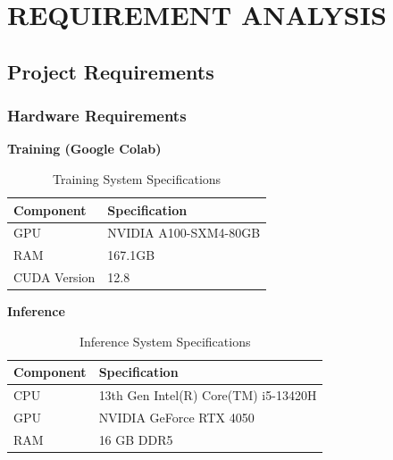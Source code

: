 \newpage
\section{\MakeUppercase{Requirement Analysis}}

\subsection{Project Requirements}

\subsubsection{Hardware Requirements}

\textbf{Training (Google Colab)}\\
\begin{table}[H]
\caption{Training System Specifications}
\label{tab:training-system-specifications}
\centering
\begin{tabular}{|l|l|}
\hline
\textbf{Component} & \textbf{Specification} \\ \hline
GPU & NVIDIA A100-SXM4-80GB \\
RAM & 167.1GB \\
CUDA Version & 12.8 \\ \hline
\end{tabular}
\end{table}

\textbf{Inference}\\
\begin{table}[H]
\caption{Inference System Specifications}
\label{tab:inference-system-specifications}
\centering
\begin{tabular}{|l|l|}
\hline
\textbf{Component} & \textbf{Specification} \\ \hline
CPU & 13th Gen Intel(R) Core(TM) i5-13420H \\
GPU & NVIDIA GeForce RTX 4050 \\
RAM & 16 GB DDR5 \\ \hline
\end{tabular}
\end{table}

